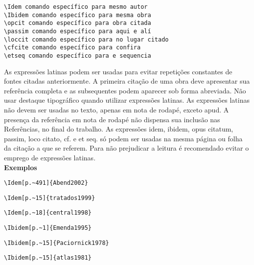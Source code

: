 \begin{alineas}
\item
\begin{verbatim}
\Idem comando específico para mesmo autor
\Ibidem comando específico para mesma obra
\opcit comando específico para obra citada
\passim comando específico para aqui e alí
\loccit comando específico para no lugar citado
\cfcite comando específico para confira
\etseq comando específico para e sequencia 
\end{verbatim} 

As expressões latinas podem ser usadas para evitar repetições constantes de fontes citadas anteriormente. A primeira citação de uma obra deve apresentar sua referência completa e as subsequentes podem aparecer sob forma abreviada. Não usar destaque tipográfico quando utilizar expressões latinas. As expressões latinas não devem ser usadas no texto, apenas em nota de rodapé, exceto apud. A presença da referência em nota de rodapé não dispensa sua inclusão nas Referências, no final do trabalho. As expressões idem, ibidem, opus citatum, passim, loco citato, cf. e et seq. só podem ser usadas na mesma página ou folha da citação a que se referem. Para não prejudicar a leitura é recomendado evitar o emprego de expressões latinas.\\

\textbf{Exemplos}

\begin{verbatim}
\Idem[p.~491]{Abend2002}
\end{verbatim}

\begin{verbatim}
\Idem[p.~15]{tratados1999}
\end{verbatim}

\begin{verbatim}
\Idem[p.~18]{central1998}
\end{verbatim}

\begin{verbatim}
\Ibidem[p.~1]{Emenda1995}
\end{verbatim}

\begin{verbatim}
\Ibidem[p.~15]{Paciornick1978}
\end{verbatim}

\begin{verbatim}
\Ibidem[p.~15]{atlas1981}
\end{verbatim}


\end{alineas}
